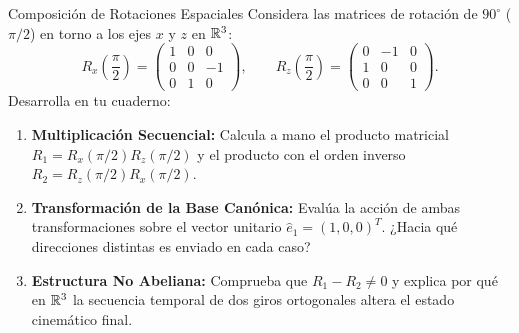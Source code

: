\documentclass[10pt,aspectratio=169]{beamer}
\begin{document}
\begin{frame}{Composición de Rotaciones Espaciales}
  \vspace{0.05cm}
  Considera las matrices de rotación de $90^\circ$ ($\pi/2$) en torno a los ejes $x$ y $z$ en $\mathbb{R}^3$:
  {\scriptsize
  \[
  R_x\left(\frac{\pi}{2}\right) = \begin{pmatrix} 1 & 0 & 0 \\ 0 & 0 & -1 \\ 0 & 1 & 0 \end{pmatrix}, \qquad
  R_z\left(\frac{\pi}{2}\right) = \begin{pmatrix} 0 & -1 & 0 \\ 1 & 0 & 0 \\ 0 & 0 & 1 \end{pmatrix}.
  \]
  }
  Desarrolla en tu cuaderno:
  \vspace{0.2cm}
  \begin{enumerate}\itemsep10pt
    \item[(a)] \textbf{Multiplicación Secuencial:} Calcula a mano el producto matricial $R_1 = R_x(\pi/2) R_z(\pi/2)$ y el producto con el orden inverso $R_2 = R_z(\pi/2) R_x(\pi/2)$.
    \item[(b)] \textbf{Transformación de la Base Canónica:} Evalúa la acción de ambas transformaciones sobre el vector unitario $\hat{e}_1 = (1, 0, 0)^T$. ¿Hacia qué direcciones distintas es enviado en cada caso?
    \item[(c)] \textbf{Estructura No Abeliana:} Comprueba que $R_1 - R_2 \neq 0$ y explica por qué en $\mathbb{R}^3$ la secuencia temporal de dos giros ortogonales altera el estado cinemático final.
  \end{enumerate}
\end{frame}
\end{document}
